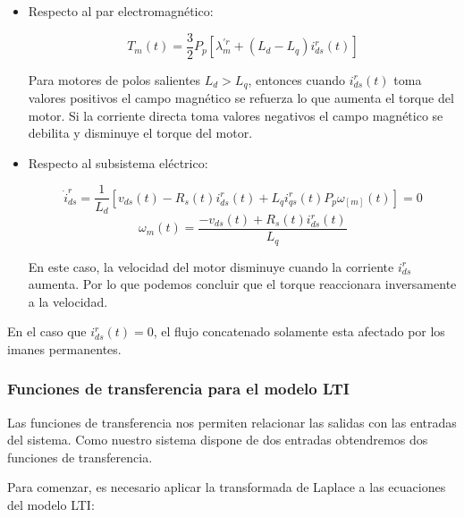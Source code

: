 \documentclass{article}
\begin{document}
\begin{itemize}
    
    \item Respecto al par electromagnético:

    \begin{equation}
        T_{m}(t) = \frac{3}{2}P_{p}[\lambda_{m}^{\prime r} + (L_{d}-L_{q})i_{ds}^r(t)]
    \end{equation}

    Para motores de polos salientes $L_{d} > L_{q}$, entonces cuando $i_{ds}^r(t)$
    toma valores positivos el campo magnético se refuerza lo que aumenta el torque del
    motor. Si la corriente directa toma valores negativos el campo magnético se debilita 
    y disminuye el torque del motor. 

    \item Respecto al subsistema eléctrico:

    \begin{equation}
        \dot{i}_{ds}^r = \frac{1}{L_{d}}[v_{ds}(t) - R_{s}(t)i_{ds}^r(t) + L_{q}i_{qs}^r(t)P_{p}\omega_[m](t)] = 0
    \end{equation}
    \begin{equation}
        \omega_{m}(t) = \frac{-v_{ds}(t) + R_{s}(t)i_{ds}^r(t)}{L_{q}}
    \end{equation}

    En este caso, la velocidad del motor disminuye cuando la corriente $i_{ds}^r$ 
    aumenta. Por lo que podemos concluir que el torque reaccionara inversamente 
    a la velocidad.

\end{itemize}

En el caso que $i_{ds}^r(t) = 0$, el flujo concatenado solamente esta afectado por 
los imanes permanentes.


\subsubsection*{Funciones de transferencia para el modelo LTI}

Las funciones de transferencia nos permiten relacionar las salidas con las entradas del sistema.
Como nuestro sistema dispone de dos entradas obtendremos dos funciones de transferencia.

Para comenzar, es necesario aplicar la transformada de Laplace a las ecuaciones del modelo LTI:
\end{document}
